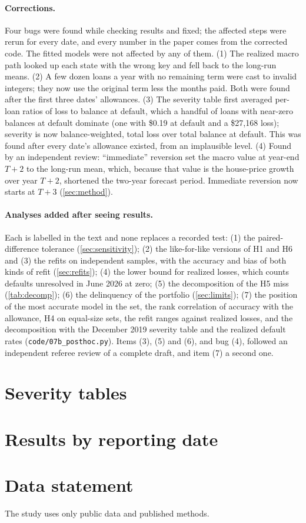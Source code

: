 \paragraph{Corrections.} Four bugs were found while checking results and
fixed; the affected steps were rerun for every date, and every number in the
paper comes from the corrected code. The fitted models were not affected by
any of them. (1) The realized macro path looked up each state with the wrong
key and fell back to the long-run means. (2) A few dozen loans a year with no
remaining term were cast to invalid integers; they now use the original term
less the months paid. Both were found after the first three dates'
allowances. (3) The severity table first averaged per-loan ratios of loss to
balance at default, which a handful of loans with near-zero balances at
default dominate (one with \$0.19 at default and a \$27{,}168 loss); severity
is now balance-weighted, total loss over total balance at default. This was
found after every date's allowance existed, from an implausible level.
(4) Found by an independent review: ``immediate'' reversion set the macro
value at year-end $T+2$ to the long-run mean, which, because that value is
the house-price growth over year $T+2$, shortened the two-year forecast
period. Immediate reversion now starts at $T+3$ (\cref{sec:method}).

\paragraph{Analyses added after seeing results.} Each is labelled in the text
and none replaces a recorded test: (1) the paired-difference tolerance
(\cref{sec:sensitivity}); (2) the like-for-like versions of H1 and H6 and
(3) the refits on independent samples, with the accuracy and bias of both
kinds of refit (\cref{sec:refits}); (4) the lower bound for realized losses,
which counts defaults unresolved in June 2026 at zero; (5) the decomposition
of the H5 miss (\cref{tab:decomp}); (6) the delinquency of the portfolio
(\cref{sec:limits}); (7) the position of the most accurate model in the set,
the rank correlation of accuracy with the allowance, H4 on equal-size sets,
the refit ranges against realized losses, and the decomposition with the
December 2019 severity table and the realized default rates
(\texttt{code/07b\_posthoc.py}). Items (3), (5) and (6), and bug (4),
followed an independent referee review of a complete draft, and item (7) a
second one.

\section{Severity tables}\label{app:lgd}



\section{Results by reporting date}\label{app:bydate}



\section{Data statement}

The study uses only public data and published methods.
